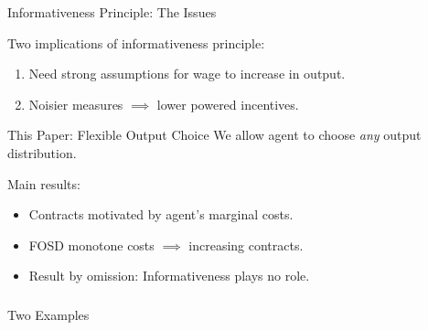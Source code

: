 \documentclass[xcolor=x11names,compress]{beamer}
\renewcommand{\(}{\begin{columns}}
\renewcommand{\)}{\end{columns}}
\newcommand{\<}[1]{\begin{column}{#1}}
\renewcommand{\>}{\end{column}}
\begin{document}
\begin{frame}{Informativeness Principle: The Issues}

Two implications of informativeness principle:\medskip
\begin{enumerate}
\item Need strong assumptions for wage to increase in output.\medskip
\item Noisier measures $\implies$ lower powered incentives. \bigskip
\end{enumerate}



\end{frame}

\begin{frame}{This Paper: Flexible Output Choice}
We allow agent to choose \emph{any} output distribution. \\ \bigskip

Main results: \medskip
\begin{itemize}
\item Contracts motivated by agent's marginal costs.\medskip
\item FOSD monotone costs $\implies$ increasing contracts. \medskip
\item Result by omission: Informativeness plays no role.
\end{itemize}
\end{frame}

\begin{frame}
	\frametitle{}
	\begin{center}
		{\color{darkblue} {\huge Two Examples}}
	\end{center}
\end{frame}
\end{document}

